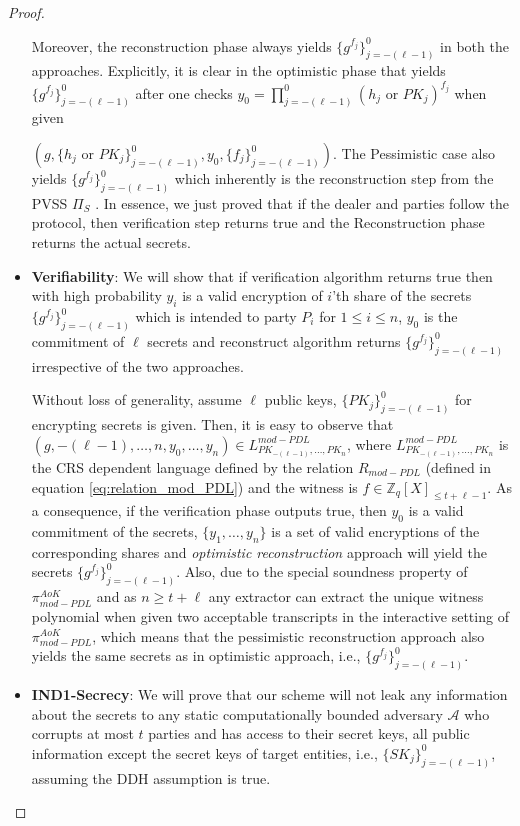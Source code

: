 \begin{proof}
\begin{itemize}
      Moreover, the reconstruction phase always yields $\{g^{f_j}\}_{j=-(\ell-1)}^0$ in both the approaches. Explicitly, it is 
      clear in the optimistic phase that yields $\{g^{f_j}\}_{j=-(\ell-1)}^0$ after one checks $y_0=\prod_{j=-(\ell-1)}^{0}(h_j\text{ or }PK_j)^{f_j}$  
      when given\par $(g,\{h_j\text{ or }PK_j\}_{j=-(\ell-1)}^0,y_0,\{f_j\}_{j=-(\ell-1)}^0)$. The Pessimistic case also yields 
      $\{g^{f_j}\}_{j=-(\ell-1)}^0$ which inherently is the reconstruction step from the PVSS $\Pi_S$ \cite{cryptoeprint:2023/1669}. 
      In essence, we just proved that if the dealer and parties follow the protocol, then verification step returns 
      true and the Reconstruction phase returns the actual secrets.
    \item \textbf{Verifiability}: We will show that if verification algorithm returns true then with high probability 
      $y_i$ is a valid encryption of $i$'th share of the secrets $\{g^{f_j}\}_{j=-(\ell-1)}^0$ 
      which is intended to party $P_i$ for $1\leq i\leq n$, $y_0$ 
      is the commitment of $\ell$ secrets and reconstruct algorithm returns $\{g^{f_j}\}_{j=-(\ell-1)}^0$ irrespective of 
      the two approaches.\par

      Without loss of generality, assume $\ell$ public keys, $\{PK_j\}_{j=-(\ell-1)}^0$ 
      for encrypting secrets is given. Then, it is easy to observe that $(g,-(\ell-1),\dots,n,y_0,\dots,y_n)\in L_{PK_{-(\ell-1)},\dots,PK_n}^{mod-PDL}$, 
      where $L_{PK_{-(\ell-1)},\dots,PK_n}^{mod-PDL}$ is the CRS dependent language defined by the relation
      $R_{mod-PDL}$ (defined in equation \ref{eq:relation_mod_PDL}) and the witness is $f\in\mathbb{Z}_q[X]_{\leq t+\ell-1}$. 
      As a consequence, if the verification phase outputs true, then $y_0$ is a valid commitment of 
      the secrets, $\{y_1,\dots,y_n\}$ is a set of valid encryptions of the corresponding shares and \textit{optimistic reconstruction} approach will 
      yield the secrets $\{g^{f_j}\}_{j=-(\ell-1)}^0$. Also, 
      due to the special soundness property of $\pi_{mod-PDL}^{AoK}$ and as $n\geq t+\ell$ 
      any extractor can extract the unique witness polynomial when given two acceptable 
      transcripts in the interactive setting of $\pi_{mod-PDL}^{AoK}$, 
      which means that the pessimistic reconstruction approach also yields the same secrets as 
      in optimistic approach, i.e., $\{g^{f_j}\}_{j=-(\ell-1)}^0$.
    \item \textbf{IND1-Secrecy}: 
      We will prove that our scheme will not leak any information about the secrets to any 
      static computationally bounded adversary $\mathcal{A}$ who corrupts at most $t$ parties and 
      has access to their secret keys, all public information except the secret keys of target entities, i.e., $\{SK_j\}_{j=-(\ell-1)}^0$, 
      assuming the DDH assumption is true.\par


\end{itemize}
\end{proof}
